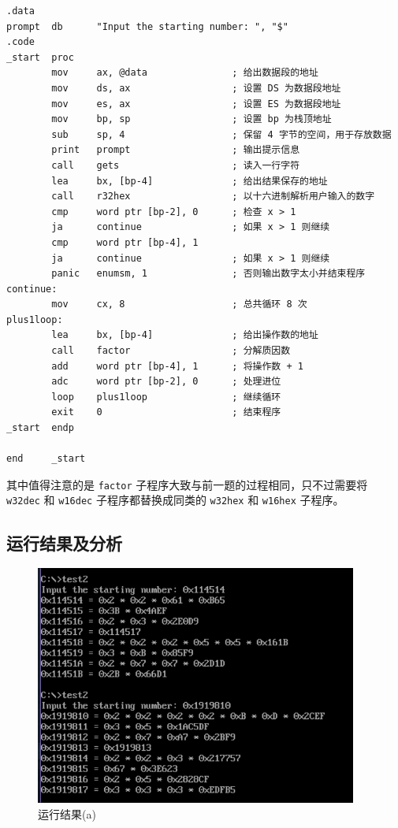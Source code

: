 \begin{lstlisting}[language={[x86masm]Assembler},morekeywords={}]
.data
prompt  db      "Input the starting number: ", "$"
.code
_start  proc
        mov     ax, @data               ; 给出数据段的地址
        mov     ds, ax                  ; 设置 DS 为数据段地址
        mov     es, ax                  ; 设置 ES 为数据段地址
        mov     bp, sp                  ; 设置 bp 为栈顶地址
        sub     sp, 4                   ; 保留 4 字节的空间，用于存放数据
        print   prompt                  ; 输出提示信息
        call    gets                    ; 读入一行字符
        lea     bx, [bp-4]              ; 给出结果保存的地址
        call    r32hex                  ; 以十六进制解析用户输入的数字
        cmp     word ptr [bp-2], 0      ; 检查 x > 1
        ja      continue                ; 如果 x > 1 则继续
        cmp     word ptr [bp-4], 1
        ja      continue                ; 如果 x > 1 则继续
        panic   enumsm, 1               ; 否则输出数字太小并结束程序
continue:
        mov     cx, 8                   ; 总共循环 8 次
plus1loop:
        lea     bx, [bp-4]              ; 给出操作数的地址
        call    factor                  ; 分解质因数
        add     word ptr [bp-4], 1      ; 将操作数 + 1
        adc     word ptr [bp-2], 0      ; 处理进位
        loop    plus1loop               ; 继续循环
        exit    0                       ; 结束程序
_start  endp

end     _start
\end{lstlisting}

其中值得注意的是 \verb|factor| 子程序大致与前一题的过程相同，只不过需要将 \verb|w32dec| 和 \verb|w16dec| 子程序都替换成同类的 \verb|w32hex| 和 \verb|w16hex| 子程序。

\subsection{运行结果及分析}

\begin{figure}
  \centering
  \includegraphics[width=300pt]{figure/test2res1.png}
  \caption{运行结果(a)}
  \label{fig:result2}
\end{figure}

